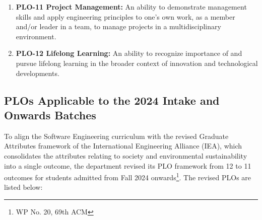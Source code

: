 \begin{enumerate}
\item \textbf{PLO-11 Project Management:} An ability to demonstrate management skills and apply engineering principles to one's own work, as a member and/or leader in a team, to manage projects in a multidisciplinary environment.
\item \textbf{PLO-12 Lifelong Learning:} An ability to recognize importance of and pursue lifelong learning in the broader context of innovation and technological developments.
\end{enumerate}

\subsection{PLOs Applicable to the 2024 Intake and Onwards Batches}
\label{sec:plosseecs}

To align the Software Engineering curriculum with the revised Graduate Attributes framework of the International Engineering Alliance (IEA), which consolidates the attributes relating to society and environmental sustainability into a single outcome, the department revised its PLO framework from 12 to 11 outcomes for students admitted from Fall 2024 onwards\footnote{WP No. 20, 69th ACM}. The revised PLOs are listed below:

